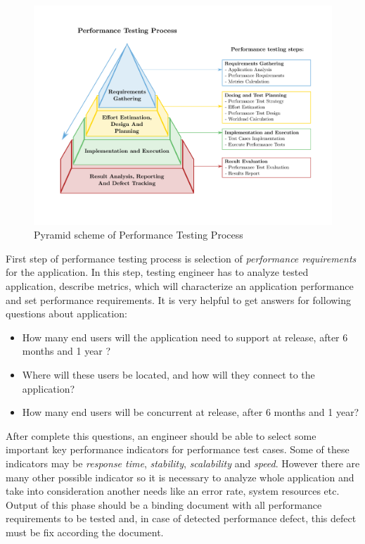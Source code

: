 \begin{figure}[H]
  \centering
  \includegraphics[width=16cm]{obrazky-figures/pyramid.pdf}
  \caption{Pyramid scheme of Performance Testing Process}
  \label{fig:performace_testing_process}
\end{figure}

First step of performance testing process is selection of \emph{performance requirements} for the application. In this step, testing engineer has to analyze tested application, describe metrics, which will characterize an application performance and set performance requirements. It is very helpful to get answers for following questions about application:

\begin{itemize}
	\setlength\itemsep{0em}
	\item How many end users will the application need to support at release, after 6 months and 1 year ?
	\item Where will these users be located, and how will they connect to the application?
	\item How many end users will be concurrent at release, after 6 months and 1 year?
\end{itemize}

After complete this questions, an engineer should be able to select some important key performance indicators for performance test cases. Some of these indicators may be \emph{response time}, \emph{stability}, \emph{scalability} and \emph{speed}. However there are many other possible indicator so it is necessary to analyze whole application and take into consideration another needs like an error rate, system resources etc.  Output of this phase should be a binding document with all performance requirements to be tested and, in case of detected performance defect, this defect must be fix according the document.

